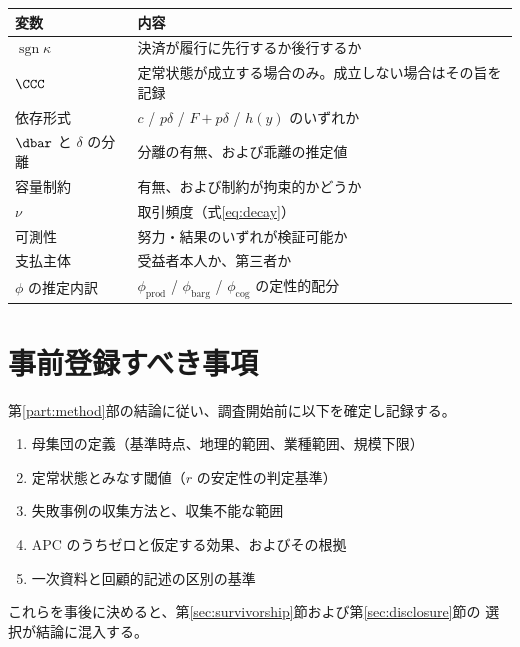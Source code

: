 \begin{center}
\begin{tabularx}{\textwidth}{@{}lX@{}}
\toprule
変数 & 内容 \\
\midrule
$\operatorname{sgn}\kappa$ & 決済が履行に先行するか後行するか \\
$\CCC$ & 定常状態が成立する場合のみ。成立しない場合はその旨を記録 \\
依存形式 & $c$ / $p\delta$ / $F+p\delta$ / $h(y)$ のいずれか \\
$\dbar$ と $\delta$ の分離 & 分離の有無、および乖離の推定値 \\
容量制約 & 有無、および制約が拘束的かどうか \\
$\nu$ & 取引頻度（式\eqref{eq:decay}） \\
可測性 & 努力・結果のいずれが検証可能か \\
支払主体 & 受益者本人か、第三者か \\
$\phi$ の推定内訳 & $\phi_{\mathrm{prod}}$ / $\phi_{\mathrm{barg}}$ / $\phi_{\mathrm{cog}}$ の定性的配分 \\
\bottomrule
\end{tabularx}
\label{tab:variables-to-record}
\end{center}

\section{事前登録すべき事項}

第\ref{part:method}部の結論に従い、調査開始前に以下を確定し記録する。

\begin{enumerate}[label=(\arabic*)]
\item 母集団の定義（基準時点、地理的範囲、業種範囲、規模下限）
\item 定常状態とみなす閾値（$r$ の安定性の判定基準）
\item 失敗事例の収集方法と、収集不能な範囲
\item APC のうちゼロと仮定する効果、およびその根拠
\item 一次資料と回顧的記述の区別の基準
\end{enumerate}

これらを事後に決めると、第\ref{sec:survivorship}節および第\ref{sec:disclosure}節の
選択が結論に混入する。

